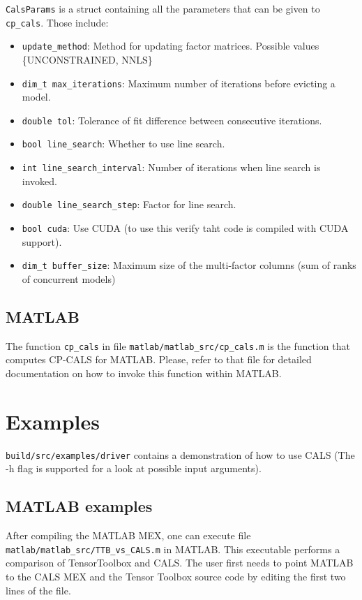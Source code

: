 \documentclass[preprint]{acmart}
\newcommand{\hlgtexttt}[1]{\texttt{\colorbox{lightgray!15}{#1}}}
\newcommand{\code}[1]{\hlgtexttt{#1}}
\begin{document}
\code{CalsParams} is a struct containing all the parameters that can be given to \code{cp\_cals}. Those include:

\begin{itemize}

\item \code{update\_method}: Method for updating factor matrices. Possible values \{UNCONSTRAINED, NNLS\}
\item \code{dim\_t max\_iterations}: Maximum number of iterations before evicting a model.
\item \code{double tol}: Tolerance of fit difference between consecutive iterations.
\item \code{bool line\_search}: Whether to use line search.
\item \code{int line\_search\_interval}: Number of iterations when line search is invoked.
\item \code{double line\_search\_step}: Factor for line search.
\item \code{bool cuda}: Use CUDA (to use this verify taht code is compiled with CUDA support).
\item \code{dim\_t buffer\_size}: Maximum size of the multi-factor columns (sum of ranks of concurrent models)

\end{itemize}


\subsection{MATLAB}
The function \code{cp\_cals} in file \code{matlab/matlab\_src/cp\_cals.m} is the function that computes CP-CALS for MATLAB. Please, refer to that file for detailed documentation on how to invoke this function within MATLAB.

\section{Examples}

\code{build/src/examples/driver} contains a demonstration of how to use CALS (The -h flag is supported for a look at possible input arguments).

\subsection{MATLAB examples}

After compiling the MATLAB MEX, one can execute file \code{matlab/matlab\_src/TTB\_vs\_CALS.m} in MATLAB. This executable performs a comparison of TensorToolbox and CALS. The user first needs to point MATLAB to the CALS MEX and the Tensor Toolbox source code by editing the first two lines of the file.
\end{document}
